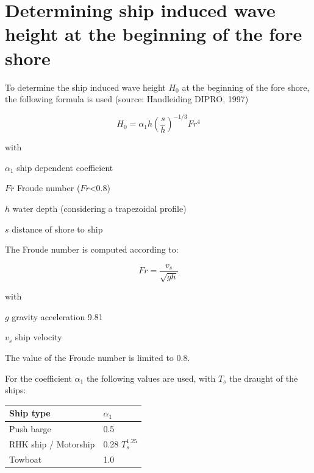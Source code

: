 \chapter{Determining ship induced wave height at the beginning of the fore shore} \label{Chp:shipwaves}

To determine the ship induced wave height $H_0$  at the beginning of the fore shore, the following formula is used (source: Handleiding DIPRO, 1997)

\begin{equation}
H_0 = \alpha_1 h \left ( \frac{s}{h} \right )^{-1/3} Fr^4
\end{equation}

with

\begin{symbollist}
\item[$\alpha_1$] ship dependent coefficient \unitbrackets{-}
\item[$Fr$] Froude number ($Fr$<0.8) \unitbrackets{-}
\item[$h$] water depth (considering a  trapezoidal profile) 
\item[$s$] distance of shore to ship 
\end{symbollist}

The Froude number is computed according to:

\begin{equation}
Fr = \frac{v_s}{\sqrt{g h}}
\end{equation}

with

\begin{symbollist}
\item[$g$] gravity acceleration 9.81 
\item[$v_s$] ship velocity 
\end{symbollist}

The value of the Froude number is limited to 0.8.

For the coefficient $\alpha_1$ the following values are used, with $T_s$  the draught of the ships:

\begin{tabular}{ll}
Ship type & $\alpha_1$ \\ \hline
Push barge & 0.5 \\
RHK ship / Motorship & 0.28 $T_s^\text{1.25}$ \\
Towboat & 1.0 \\ \hline
\end{tabular}

